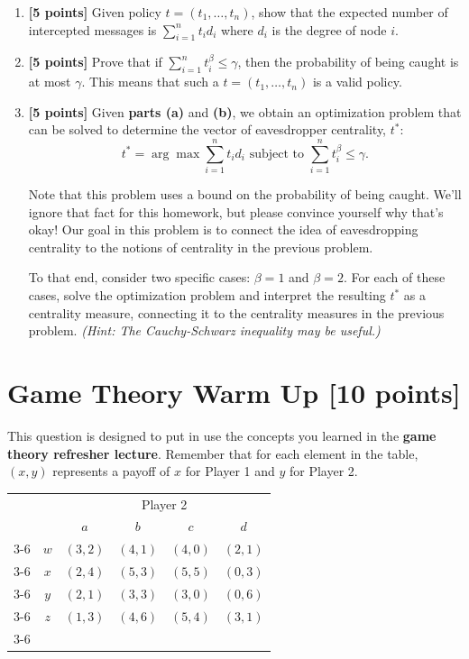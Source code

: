 \documentclass[11pt]{article}
\begin{document}
\begin{enumerate}[label=(\alph*)]
\item \textbf{[5 points]} Given policy $t = (t_1, \ldots, t_n)$, show that the expected number of intercepted messages is $\sum_{i=1}^n t_i d_i$ where $d_i$ is the degree of node $i$.

\item \textbf{[5 points]} Prove that if $\sum_{i=1}^n t_i^{\beta} \leq \gamma$, then the probability of being caught is at most $\gamma$. This means that such a $t = (t_1, \ldots, t_n)$ is a valid policy.

\item \textbf{[5 points]} Given \textbf{parts (a)} and \textbf{(b)}, we obtain an optimization problem that can be solved to determine the vector of eavesdropper centrality, $t^*$:
\begin{equation}
t^* = \arg \max \sum_{i=1}^n t_i d_i \text{ subject to } \sum_{i=1}^n t_i^{\beta} \leq \gamma.
\end{equation}

Note that this problem uses a bound on the probability of being caught. We'll ignore that fact for this homework, but please convince yourself why that's okay! Our goal in this problem is to connect the idea of eavesdropping centrality to the notions of centrality in the previous problem.

To that end, consider two specific cases: $\beta = 1$ and $\beta = 2$. For each of these cases, solve the optimization problem and interpret the resulting $t^*$ as a centrality measure, connecting it to the centrality measures in the previous problem. \textit{(Hint: The Cauchy-Schwarz inequality may be useful.)}
\end{enumerate}

\section{Game Theory Warm Up [10 points]}

This question is designed to put in use the concepts you learned in the \textbf{game theory refresher lecture}. Remember that for each element in the table, $(x, y)$ represents a payoff of $x$ for Player 1 and $y$ for Player 2.

\begin{center}
\begin{tabular}{cc|c|c|c|c|}
\multicolumn{2}{c}{} & \multicolumn{4}{c}{Player 2} \\
\multicolumn{2}{c}{} & $a$ & $b$ & $c$ & $d$ \\
\cline{3-6}
\multirow{4}{*}{Player 1} & $w$ & $(3, 2)$ & $(4, 1)$ & $(4, 0)$ & $(2, 1)$ \\
\cline{3-6}
& $x$ & $(2, 4)$ & $(5, 3)$ & $(5, 5)$ & $(0, 3)$ \\
\cline{3-6}
& $y$ & $(2, 1)$ & $(3, 3)$ & $(3, 0)$ & $(0, 6)$ \\
\cline{3-6}
& $z$ & $(1, 3)$ & $(4, 6)$ & $(5, 4)$ & $(3, 1)$ \\
\cline{3-6}
\end{tabular}
\end{center}
\end{document}
